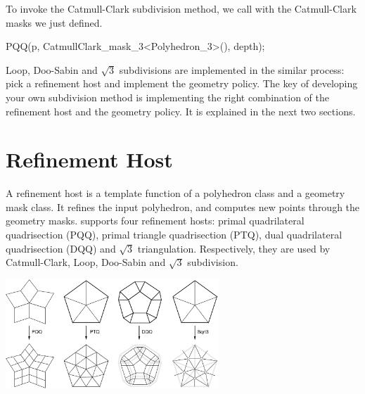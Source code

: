 To invoke the Catmull-Clark subdivision method, we
call  with the Catmull-Clark masks we just defined.

\begin{ccExampleCode}
PQQ(p, CatmullClark_mask_3<Polyhedron_3>(), depth);
\end{ccExampleCode}


Loop, Doo-Sabin and $\sqrt{3}$ subdivisions are implemented 
in the similar process: pick a refinement host and implement 
the geometry policy. The key of developing your own 
subdivision method is implementing the right combination of 
the refinement host and the geometry policy. It is 
explained in the next two sections.

\section{Refinement Host}
\label{secRefHost}
A refinement host is a template function of 
a polyhedron class and a geometry mask class. It refines
the input polyhedron, and computes new points through the geometry masks.
 supports four refinement hosts:
primal quadrilateral quadrisection (PQQ), 
primal triangle quadrisection (PTQ), dual quadrilateral 
quadrisection (DQQ) and $\sqrt{3}$ triangulation.
Respectively, they are used by Catmull-Clark, Loop, Doo-Sabin 
and $\sqrt{3}$ subdivision. 

\begin{ccTexOnly}
  \begin{center}
    \parbox{0.6\textwidth}{%
      \includegraphics[width=0.6\textwidth]{Subdivision_method_3/FIG/RefSchemes}%
    }\\ \vspace{0.5cm}
  \end{center}
\end{ccTexOnly}

